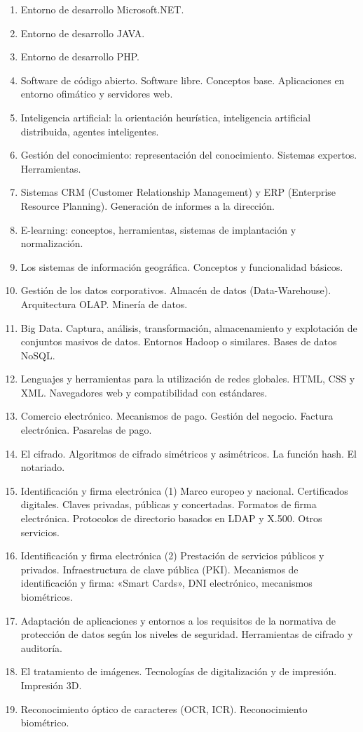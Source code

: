 \begin{enumerate}
		\item Entorno de desarrollo Microsoft.NET.
		\item Entorno de desarrollo JAVA.
		\item Entorno de desarrollo PHP.
		\item Software de código abierto. Software libre. Conceptos base. Aplicaciones en entorno ofimático y servidores web.
		\item Inteligencia artificial: la orientación heurística, inteligencia artificial distribuida, agentes inteligentes.
		\item Gestión del conocimiento: representación del conocimiento. Sistemas expertos. Herramientas.
		\item Sistemas CRM (Customer Relationship Management) y ERP (Enterprise Resource Planning). Generación de informes a la dirección.
		\item E-learning: conceptos, herramientas, sistemas de implantación y normalización. 
		\item Los sistemas de información geográfica. Conceptos y funcionalidad básicos.
		\item Gestión de los datos corporativos. Almacén de datos (Data-Warehouse). Arquitectura OLAP. Minería de datos.
		\item Big Data. Captura, análisis, transformación, almacenamiento y explotación de conjuntos masivos de datos. Entornos Hadoop o similares. Bases de datos NoSQL.
		\item Lenguajes y herramientas para la utilización de redes globales. HTML, CSS y XML. Navegadores web y compatibilidad con estándares.
		\item Comercio electrónico. Mecanismos de pago. Gestión del negocio. Factura electrónica. Pasarelas de pago.
		\item El cifrado. Algoritmos de cifrado simétricos y asimétricos. La función hash. El notariado.
		\item Identificación y firma electrónica (1) Marco europeo y nacional. Certificados digitales. Claves privadas, públicas y concertadas. Formatos de firma electrónica. Protocolos de directorio basados en LDAP y X.500. Otros servicios.
		\item Identificación y firma electrónica (2) Prestación de servicios públicos y privados. Infraestructura de clave pública (PKI). Mecanismos de identificación y firma: «Smart Cards», DNI electrónico, mecanismos biométricos.
		\item Adaptación de aplicaciones y entornos a los requisitos de la normativa de protección de datos según los niveles de seguridad. Herramientas de cifrado y auditoría.
		\item El tratamiento de imágenes. Tecnologías de digitalización y de impresión. Impresión 3D.
		\item Reconocimiento óptico de caracteres (OCR, ICR). Reconocimiento biométrico.
	\end{enumerate}
